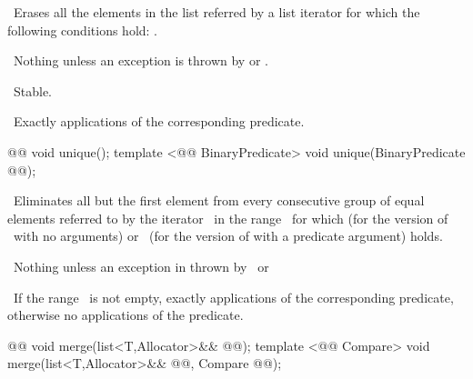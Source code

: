 \documentclass[american,twoside]{book}
\begin{document}
\begin{itemdescr}
\pnum
\effects\ 
Erases all the elements in the list referred by a list iterator
for which the following conditions hold:
.

\pnum
\throws\ 
Nothing unless an exception is thrown by
or
.

\pnum
\notes\ 
Stable.

\pnum
\complexity\ 
Exactly
applications of the corresponding predicate.
\end{itemdescr}

%
\begin{itemdecl}
@@ void unique();
template <@@ BinaryPredicate> void unique(BinaryPredicate @@);
\end{itemdecl}

\begin{itemdescr}
\pnum
\effects\ 
Eliminates all but the first element from every
consecutive group of equal elements referred to by the
iterator
\
in the range
\
for which
(for the version of
\
with no arguments) or
\
(for the version of
with a predicate argument)
holds.

\pnum
\throws\ 
Nothing unless an exception in thrown by
\tcode{*i == *(i-1)}\
or
\tcode{\farg{pred}(*i, *(i - 1))}\

\pnum
\complexity\ 
If the range
\tcode{[\farg{first}, \farg{last})}\
is not empty, exactly
applications of the corresponding predicate,
otherwise no applications of the predicate.
\end{itemdescr}

%
\begin{itemdecl}
@@ void merge(list<T,Allocator>&& @@);
template <@@ Compare> void merge(list<T,Allocator>&& @@, Compare @@);
\end{itemdecl}
\end{document}
